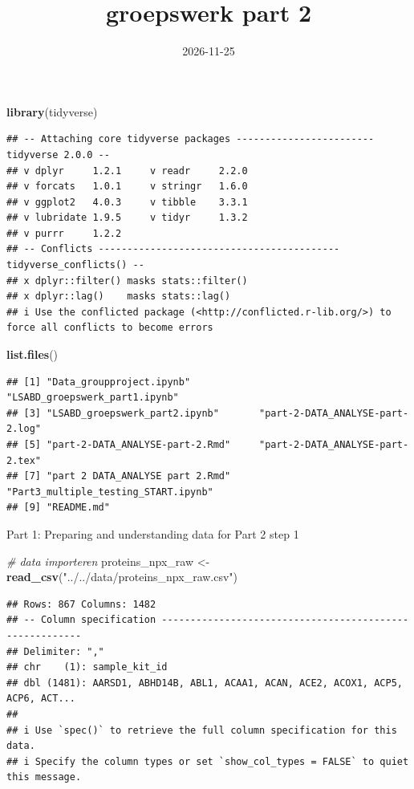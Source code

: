 \documentclass[
]{article}
\title{groepswerk part 2}
\author{}
\date{\vspace{-2.5em}2026-11-25}
\newenvironment{Shaded}{\begin{snugshade}}{\end{snugshade}}
\newcommand{\CommentTok}[1]{\textcolor[rgb]{0.56,0.35,0.01}{\textit{#1}}}
\newcommand{\FunctionTok}[1]{\textcolor[rgb]{0.13,0.29,0.53}{\textbf{#1}}}
\newcommand{\NormalTok}[1]{#1}
\newcommand{\OtherTok}[1]{\textcolor[rgb]{0.56,0.35,0.01}{#1}}
\newcommand{\StringTok}[1]{\textcolor[rgb]{0.31,0.60,0.02}{#1}}
\begin{document}
\maketitle

\begin{Shaded}
\begin{Highlighting}[]
\FunctionTok{library}\NormalTok{(tidyverse)}
\end{Highlighting}
\end{Shaded}

\begin{verbatim}
## -- Attaching core tidyverse packages ------------------------ tidyverse 2.0.0 --
## v dplyr     1.2.1     v readr     2.2.0
## v forcats   1.0.1     v stringr   1.6.0
## v ggplot2   4.0.3     v tibble    3.3.1
## v lubridate 1.9.5     v tidyr     1.3.2
## v purrr     1.2.2     
## -- Conflicts ------------------------------------------ tidyverse_conflicts() --
## x dplyr::filter() masks stats::filter()
## x dplyr::lag()    masks stats::lag()
## i Use the conflicted package (<http://conflicted.r-lib.org/>) to force all conflicts to become errors
\end{verbatim}

\begin{Shaded}
\begin{Highlighting}[]
\FunctionTok{list.files}\NormalTok{()}
\end{Highlighting}
\end{Shaded}

\begin{verbatim}
## [1] "Data_groupproject.ipynb"            "LSABD_groepswerk_part1.ipynb"      
## [3] "LSABD_groepswerk_part2.ipynb"       "part-2-DATA_ANALYSE-part-2.log"    
## [5] "part-2-DATA_ANALYSE-part-2.Rmd"     "part-2-DATA_ANALYSE-part-2.tex"    
## [7] "part 2 DATA_ANALYSE part 2.Rmd"     "Part3_multiple_testing_START.ipynb"
## [9] "README.md"
\end{verbatim}

Part 1: Preparing and understanding data for Part 2 step 1

\begin{Shaded}
\begin{Highlighting}[]
\CommentTok{\# data importeren }
\NormalTok{proteins\_npx\_raw }\OtherTok{\textless{}{-}} \FunctionTok{read\_csv}\NormalTok{(}\StringTok{"../../data/proteins\_npx\_raw.csv"}\NormalTok{)}
\end{Highlighting}
\end{Shaded}

\begin{verbatim}
## Rows: 867 Columns: 1482
## -- Column specification --------------------------------------------------------
## Delimiter: ","
## chr    (1): sample_kit_id
## dbl (1481): AARSD1, ABHD14B, ABL1, ACAA1, ACAN, ACE2, ACOX1, ACP5, ACP6, ACT...
## 
## i Use `spec()` to retrieve the full column specification for this data.
## i Specify the column types or set `show_col_types = FALSE` to quiet this message.
\end{verbatim}
\end{document}
